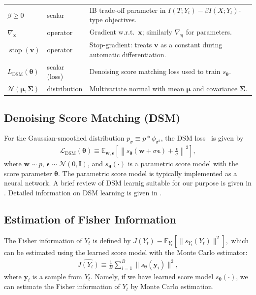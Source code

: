 \documentclass[conference]{IEEEtran}
\newcommand{\E}{\mathbb{E}}
\newcommand{\bI}{\bm{I}}
\newcommand{\Yt}{Y_t}
\newcommand{\sYt}{s_{\Yt}}
\begin{document}
\begin{table}[t]
\begin{tabular}{p{} p{} p{}}
  $\beta \ge 0$                    & scalar                   & IB trade-off parameter in $I(T;Y_t)-\beta I(X;Y_t)$-type objectives. \\
  $\nabla_{\bm x}$                       & operator                 & Gradient w.r.t.\ $\bm x$; similarly $\nabla_{\bm \eta}$ for parameters. \\
  $\operatorname{stop}(\bm v)$         & operator                 & Stop-gradient: treats $\bm v$ as a constant during automatic differentiation. \\
  $L_{\mathrm{DSM}}(\bm \theta)$       & scalar (loss)            & Denoising score matching loss used to train $s_{\bm \theta}$. \\
  $\mathcal{N}(\bm \mu,\bm \Sigma)$        & distribution             & Multivariate normal with mean $\bm \mu$ and covariance $\bm \Sigma$. \\
  \hline
  \end{tabular}
  \end{table}
  
\subsection{Denoising Score Matching (DSM)}
\label{subsec:dsm}
For the Gaussian-smoothed distribution $p_\sigma \equiv p * \phi_{\sigma^2}$, 
the DSM loss~\cite{vincent2011} is given by
\begin{align}
\mathcal{L}_{\text{DSM}}(\bm \theta) \equiv \E_{\bm{w},\bm{\epsilon}}
\left[\left\|s_{\bm \theta}(\bm{w} + \sigma\bm{\epsilon}) 
+ \frac{\bm{\epsilon}}{\sigma}\right\|^2\right],
\end{align}
where $\bm{w} \sim p$, $\bm{\epsilon} \sim \mathcal{N}(0, \bI)$, 
and $s_{\bm \theta}(\cdot)$ is a parametric score model with the score parameter $\bm \theta$.
The parametric score model is typically implemented as a neural network.
A brief review of DSM learnig suitable for our purpose is given in \cite{wadayama2025}.
Detailed information on DSM learning is given in \cite{vincent2011,song2019,song2021}.

\subsection{Estimation of Fisher Information}
The Fisher information of $\Yt$ is defined by 
$
J(\Yt) \equiv \E_{\Yt}[\|\sYt(Y_t)\|^2],
$
which can be estimated using the learned score model with the Monte Carlo estimator:
\begin{align}
\widehat{J(\Yt)} \equiv \frac{1}{B}\sum_{i=1}^B \|s_{\bm \theta}(\bm{y}_i)\|^2,
\end{align}
where $\bm{y}_i$ is a sample from $\Yt$. Namely, if we have learned score
model $s_{\bm \theta}(\cdot)$, we can estimate the Fisher information of $\Yt$ 
by Monte Carlo estimation.
\end{document}
